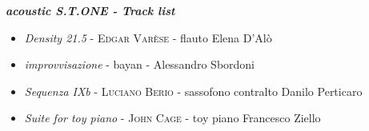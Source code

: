 \vfill
\noindent \textit{\textbf{acoustic S.T.ONE - Track list}}

\begin{itemize}
\item \emph{Density 21.5} - \textsc{Edgar Var\`ese}  - flauto  Elena D’Al\`o
\item \emph{improvvisazione } - bayan  - Alessandro Sbordoni
\item \emph{Sequenza IXb} -  \textsc{Luciano Berio} -  sassofono contralto  Danilo Perticaro
\item \emph{Suite for toy piano} - \textsc{John Cage} - toy piano Francesco Ziello
\end{itemize}
